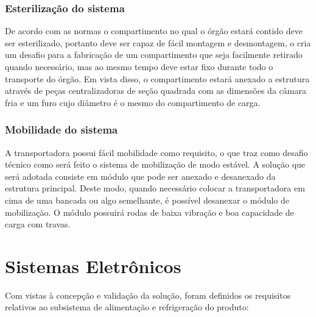 \subsubsection{Esterilização do sistema}
De acordo com as normas o compartimento no qual o órgão estará contido deve ser esterilizado, portanto deve ser capaz de fácil montagem e desmontagem, o cria um desafio para a fabricação de um compartimento que seja facilmente retirado quando necessário, mas ao mesmo tempo deve estar fixo durante todo o transporte do órgão. Em vista disso, o compartimento estará anexado a estrutura através de peças centralizadoras de seção quadrada com as dimensões da câmara fria e um furo cujo diâmetro é o mesmo do compartimento de carga.
         
\subsubsection{Mobilidade do sistema}
A transportadora possui fácil mobilidade como requisito, o que traz como desafio técnico como será feito o sistema de mobilização de modo estável. A solução que será adotada consiste em módulo que pode ser anexado e desanexado da estrutura principal. Deste modo, quando necessário colocar a transportadora em cima de uma bancada ou algo semelhante, é possível desanexar o módulo de mobilização. O módulo possuirá rodas de baixa vibração e boa capacidade de carga com travas.
\section{Sistemas Eletrônicos}
Com vistas à concepção e validação da solução, foram definidos os requisitos relativos ao subsistema de alimentação e refrigeração do produto:

